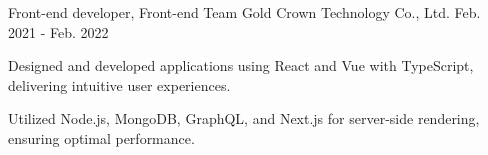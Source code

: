 

\begin{cventries}

  \cventry
    {Front-end developer, Front-end Team} %
    {\color{gray}Gold Crown Technology Co., Ltd.}
    {}
    {Feb. 2021 - Feb. 2022} %
    {
      \begin{cvitems} %
        \item {Designed and developed applications using React and Vue with TypeScript, delivering intuitive user experiences.}
        \item {Utilized Node.js, MongoDB, GraphQL, and Next.js for server-side rendering, ensuring optimal performance.}
      \end{cvitems}
    }
\end{cventries}
